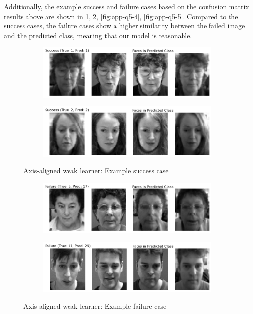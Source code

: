 Additionally, the example success and failure cases based on the confusion matrix results above are shown in \cref{fig:app-q5-2}, \cref{fig:app-q5-3}, \cref{fig:app-q5-4}, \cref{fig:app-q5-5}. Compared to the success cases, the failure cases show a higher similarity between the failed image and the predicted class, meaning that our model is reasonable.
\begin{figure}[htbp]
	\centering
	\begin{subfigure}{0.45\linewidth}
		\centering
		\includegraphics[width=\linewidth]{image/q5-app/q5-axis-succ1.png}
	\end{subfigure}%
	\quad
	\begin{subfigure}{0.45\linewidth}
		\centering
		\includegraphics[width=\linewidth]{image/q5-app/q5-axis-succ2.png}
	\end{subfigure}
	\caption{Axis-aligned weak learner: Example success case}
	\label{fig:app-q5-2}
\end{figure}
\begin{figure}[htbp]
	\centering
	\begin{subfigure}[t]{0.45\linewidth}
		\centering
		\includegraphics[width=\linewidth]{image/q5-app/q5-axis-fail1.png}
	\end{subfigure}%
	\quad
	\begin{subfigure}[t]{0.45\linewidth}
		\centering
		\includegraphics[width=\linewidth]{image/q5-app/q5-axis-fail2.png}
	\end{subfigure}
	\caption{Axis-aligned weak learner: Example failure case}
	\label{fig:app-q5-3}
\end{figure}

